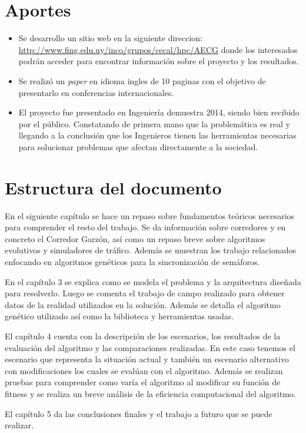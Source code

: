 \section{Aportes}

\begin{itemize}
	\item Se desarrollo un sitio web en la siguiente direccion: \url{http://www.fing.edu.uy/inco/grupos/cecal/hpc/AECG} donde los interesados podrán acceder para encontrar información sobre el proyecto y los resultados. 
	\item Se realizó un \emph{paper} en idioma ingles de 10 paginas con el objetivo de presentarlo en conferencias internacionales.
	\item El proyecto fue presentado en Ingeniería demuestra 2014, siendo bien recibido por el público. Constatando de primera mano que la problemática es real y llegando a la conclusión que los Ingenieros tienen las herramientas necesarias para solucionar problemas que afectan directamente a la sociedad.

\end{itemize}






\section{Estructura del documento}
En el siguiente capítulo se hace un repaso sobre fundamentos teóricos necesarios para comprender el resto del trabajo. Se da información sobre corredores y en concreto el Corredor Garzón, así como un repaso breve sobre algoritmos evolutivos y simuladores de tráfico. Además se muestran los trabajo relacionados enfocando en algoritmos genéticos para la sincronización de semáforos.

En el capítulo 3 se explica como se modela el problema y la arquitectura diseñada  para resolverlo. Luego se comenta el trabajo de campo realizado para obtener datos de la realidad utilizados en la solución. Además se detalla el algoritmo genético utilizado así como la biblioteca y herramientas usadas.

El capítulo 4 cuenta con la descripción de los escenarios, los resultados de la evaluación del algoritmo y las comparaciones realizadas. En este caso tenemos el escenario que representa la situación actual y también un escenario alternativo con modificaciones los cuales se evalúan con el algoritmo. Además se realizan pruebas para comprender como varía el algoritmo al modificar su función de fitness y se realiza un breve análisis de la eficiencia computacional del algoritmo.

El capítulo 5 da las conclusiones finales y el trabajo a futuro que se puede realizar.






